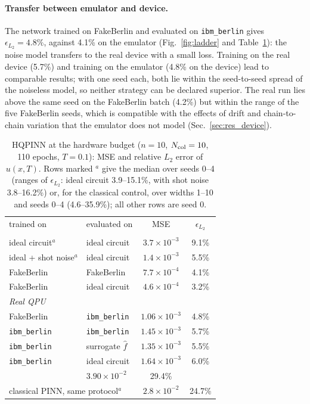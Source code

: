 \documentclass[floatfix,aps,pra,twocolumn,superscriptaddress,10pt,nofootinbib]{revtex4-2}
\newcommand{\Ncol}{N_{\rm col}}
\begin{document}
\paragraph{Transfer between emulator and device.} The network trained on FakeBerlin and evaluated on \texttt{ibm\_berlin} gives $\epsilon_{L_2}=4.8\%$, against 4.1\% on the emulator (Fig.~\ref{fig:ladder} and Table~\ref{tab:hw}): the noise model transfers to the real device with a small loss. Training on the real device (5.7\%) and training on the emulator (4.8\% on the device) lead to comparable results; with one seed each, both lie within the seed-to-seed spread of the noiseless model, so neither strategy can be declared superior. The real run lies above the same seed on the FakeBerlin batch (4.2\%) but within the range of the five FakeBerlin seeds, which is compatible with the effects of drift and chain-to-chain variation that the emulator does not model (Sec.~\ref{sec:res_device}).

\begin{table}[b]
\caption{\justifying HQPINN at the hardware budget ($n=10$, $\Ncol=10$, 110 epochs, $T=0.1$): MSE and relative $L_2$ error of $u(x,T)$. Rows marked $^{a}$ give the median over seeds 0--4 (ranges of $\epsilon_{L_2}$: ideal circuit 3.9--15.1\%, with shot noise 3.8--16.2\%) or, for the classical control, over widths 1--10 and seeds 0--4 (4.6--35.9\%); all other rows are seed 0.}
\label{tab:hw}
\setlength{\tabcolsep}{2.5pt}
\footnotesize
\begin{ruledtabular}
\begin{tabular}{llcc}
trained on & evaluated on & MSE & $\epsilon_{L_2}$\\
\colrule
\multicolumn{4}{l}{\emph{Simulation}}\\
ideal circuit$^{a}$ & ideal circuit & $3.7\times10^{-3}$ & 9.1\%\\
ideal + shot noise$^{a}$ & ideal circuit & $1.4\times10^{-3}$ & 5.5\%\\
FakeBerlin & FakeBerlin & $7.7\times10^{-4}$ & 4.1\%\\
FakeBerlin & ideal circuit & $4.6\times10^{-4}$ & 3.2\%\\
\multicolumn{4}{l}{\emph{Real QPU}}\\
FakeBerlin & \texttt{ibm\_berlin} & $1.06\times10^{-3}$ & 4.8\%\\
\texttt{ibm\_berlin} & \texttt{ibm\_berlin} & $1.45\times10^{-3}$ & 5.7\%\\
\texttt{ibm\_berlin} & surrogate $\hat f$ & $1.35\times10^{-3}$ & 5.5\%\\
\texttt{ibm\_berlin} & ideal circuit & $1.64\times10^{-3}$ & 6.0\%\\
\colrule
\multicolumn{2}{l}{initial network} & $3.90\times10^{-2}$ & 29.4\%\\
\multicolumn{2}{l}{classical PINN, same protocol$^{a}$} & $2.8\times10^{-2}$ & 24.7\%\\
\end{tabular}
\end{ruledtabular}
\end{table}
\end{document}
